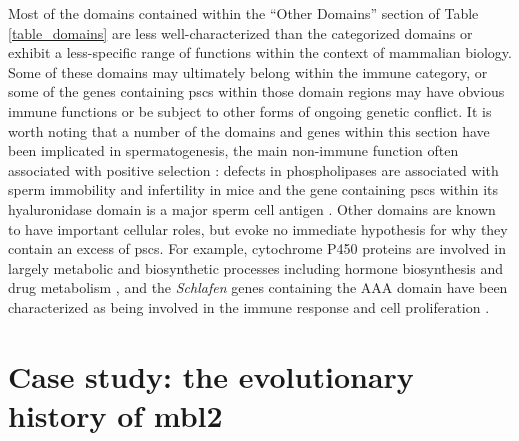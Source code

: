 Most of the domains contained within the ``Other Domains'' section of
Table \ref{table_domains} are less well-characterized than the
categorized domains or exhibit a less-specific range of functions
within the context of mammalian biology. Some of these domains may
ultimately belong within the immune category, or some of the genes
containing \acp{psc} within those domain regions may have obvious
immune functions or be subject to other forms of ongoing genetic
conflict. It is worth noting that a number of the domains and genes
within this section have been implicated in spermatogenesis, the main
non-immune function often associated with positive selection
\citep{Wyckoff2000,Torgerson2002,Nielsen2005}: defects in
phospholipases are associated with sperm immobility and infertility in
mice \citep{Murakami2010,Sato2010} and the  gene
containing \acp{psc} within its hyaluronidase domain is a major sperm
cell antigen \citep{MartinDeLeon2006}. Other domains are known to have
important cellular roles, but evoke no immediate hypothesis for why
they contain an excess of \acp{psc}. For example, cytochrome P450
proteins are involved in largely metabolic and biosynthetic processes
including hormone biosynthesis and drug metabolism
\citep{WerckReichhart2000}, and the \emph{Schlafen} genes containing
the AAA domain have been characterized as being involved in the immune
response and cell proliferation \citep{Bustos2009}.


\section{Case study: the \sw evolutionary history of \ac{mbl2}}


